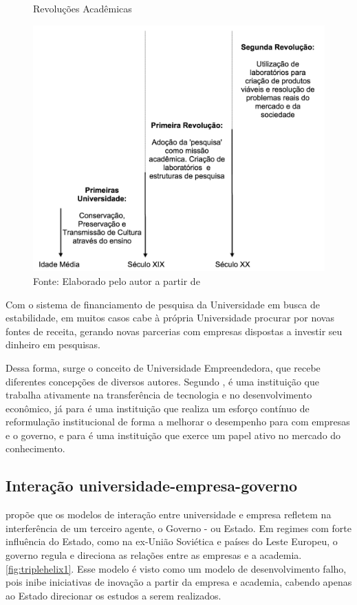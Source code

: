 \begin{figure}
\caption{Revoluções Acadêmicas}
\centerline{\includegraphics[scale=0.5]{img/academic_revolutions}}
\label{fig:academic_revolutions}
\caption* {Fonte: Elaborado pelo autor a partir de }
\end{figure}

Com o sistema de financiamento de pesquisa da Universidade em  busca de estabilidade, em muitos casos cabe à própria Universidade procurar por novas fontes de receita, gerando novas parcerias com empresas dispostas a investir seu dinheiro em pesquisas.

Dessa forma, surge o conceito de Universidade Empreendedora, que recebe diferentes concepções de diversos autores. Segundo , é uma instituição que trabalha ativamente na transferência de tecnologia e no desenvolvimento econômico, já para  é uma instituição que realiza um esforço contínuo de reformulação institucional de forma a melhorar o desempenho para com empresas e o governo, e para  é uma instituição que exerce um papel ativo no mercado do conhecimento.

\subsection{Interação universidade-empresa-governo}
\label{cha:univ_empreend}

 propõe que os modelos de interação entre universidade e empresa refletem na interferência de um terceiro agente, o Governo - ou Estado. Em regimes com forte influência do Estado, como na ex-União Soviética e países do Leste Europeu, o governo regula e direciona as relações entre as empresas e a academia. \ref{fig:triplehelix1}. Esse modelo é visto como um modelo de desenvolvimento falho, pois inibe iniciativas de inovação a partir da empresa e academia, cabendo apenas ao Estado direcionar os estudos a serem realizados.

